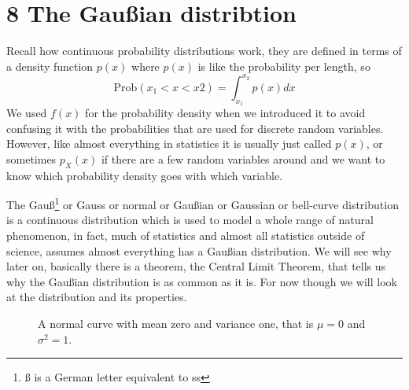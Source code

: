 \documentclass[11pt,a4paper]{scrartcl}
\begin{document}
\section*{8 The Gau\ss{}ian distribtion}

Recall how continuous probability distributions work, they are defined
in terms of a density function $p(x)$ where $p(x)$ is like the
probability per length, so 
\begin{equation}
\mbox{Prob}(x_1<x<x2)=\int_{x_1}^{x_2} p(x)dx
\end{equation}
We used $f(x)$ for the probability density when we introduced it to
avoid confusing it with the probabilities that are used for discrete
random variables. However, like almost everything in statistics it is
usually just called $p(x)$, or sometimes $p_X(x)$ if there are a few
random variables around and we want to know which probability density
goes with which variable.

The Gau\ss\footnote{\ss{} is a German letter equivalent to ss} or Gauss
or normal or Gau\ss{}ian or Gaussian or bell-curve distribution is a
continuous distribution which is used to model a whole range of
natural phenomenon, in fact, much of statistics and almost all
statistics outside of science, assumes almost everything has a
Gau\ss{}ian distribution. We will see why later on, basically there is
a theorem, the Central Limit Theorem, that tells us why the
Gau\ss{}ian distribution is as common as it is. For now though we will
look at the distribution and its properties.

\begin{figure}[tb]
\begin{center}

\end{center}
\caption{A normal curve with mean zero and variance one, that is $\mu=0$ and $\sigma^2=1$.\label{fig_gauss}}
\end{figure}
\end{document}
